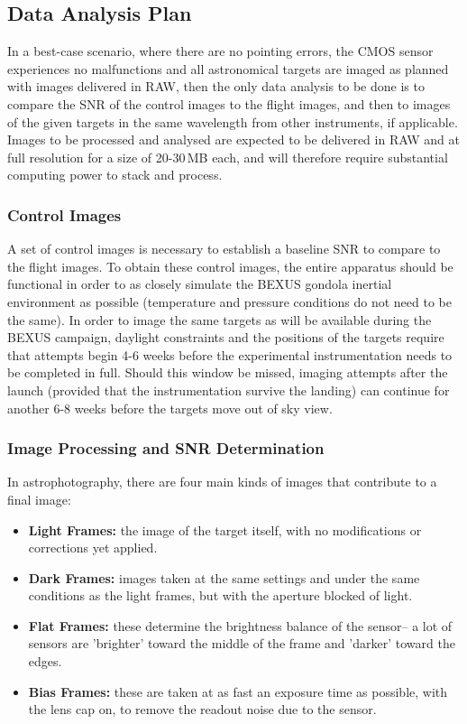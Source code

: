 \subsection{Data Analysis Plan}

In a best-case scenario, where there are no pointing errors, the CMOS sensor experiences no malfunctions and all astronomical targets are imaged as planned with images delivered in RAW, then the only data analysis to be done is to compare the SNR of the control images to the flight images, and then to images of the given targets in the same wavelength from other instruments, if applicable.  Images to be processed and analysed are expected to be delivered in RAW and at full resolution for a size of 20-30\,MB each, and will therefore require substantial computing power to stack and process.

\subsubsection{Control Images}

A set of control images is necessary to establish a baseline SNR to compare to the flight images. To obtain these control images, the entire apparatus should be functional in order to as closely simulate the BEXUS gondola inertial environment as possible (temperature and pressure conditions do not need to be the same). In order to image the same targets as will be available during the BEXUS campaign, daylight constraints and the positions of the targets require that attempts begin 4-6 weeks before the experimental instrumentation needs to be completed in full. Should this window be missed, imaging attempts after the launch (provided that the instrumentation survive the landing) can continue for another 6-8 weeks before the targets move out of sky view.

\subsubsection{Image Processing and SNR Determination}

In astrophotography, there are four main kinds of images that contribute to a final image:
\begin{itemize}
    \item \textbf{Light Frames:} the image of the target itself, with no modifications or corrections yet applied.
    \item \textbf{Dark Frames:} images taken at the same settings and under the same conditions as the light frames, but with the aperture blocked of light.
    \item \textbf{Flat Frames:} these determine the brightness balance of the sensor-- a lot of sensors are 'brighter' toward the middle of the frame and 'darker' toward the edges.
    \item \textbf{Bias Frames:} these are taken at as fast an exposure time as possible, with the lens cap on, to remove the readout noise due to the sensor.
\end{itemize}

